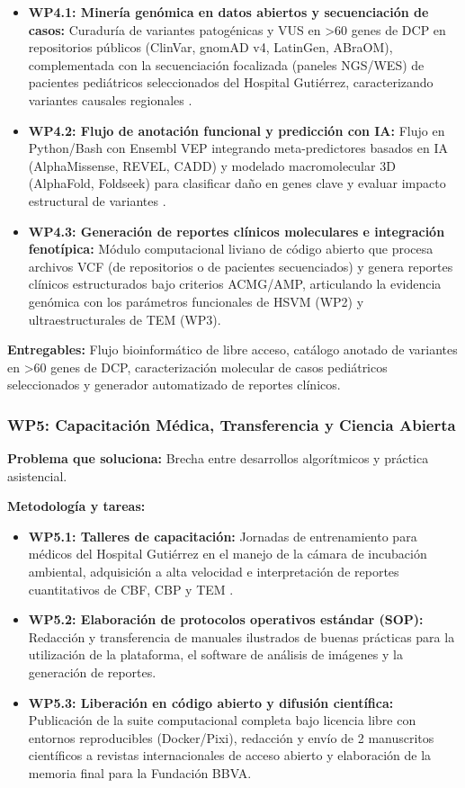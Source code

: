 \documentclass[11pt,letterpaper]{article}
\begin{document}
\begin{itemize}[leftmargin=*,noitemsep,topsep=1pt]
    \item \textbf{WP4.1: Minería genómica en datos abiertos y secuenciación de casos:} Curaduría de variantes patogénicas y VUS en >60 genes de DCP en repositorios públicos (ClinVar, gnomAD v4, LatinGen, ABraOM), complementada con la secuenciación focalizada (paneles NGS/WES) de pacientes pediátricos seleccionados del Hospital Gutiérrez, caracterizando variantes causales regionales \cite{Collison2025}.
    \item \textbf{WP4.2: Flujo de anotación funcional y predicción con IA:} Flujo en Python/Bash con Ensembl VEP integrando meta-predictores basados en IA (AlphaMissense, REVEL, CADD) y modelado macromolecular 3D (AlphaFold, Foldseek) para clasificar daño en genes clave y evaluar impacto estructural de variantes \cite{Paff2021,Wrona2025}.
    \item \textbf{WP4.3: Generación de reportes clínicos moleculares e integración fenotípica:} Módulo computacional liviano de código abierto que procesa archivos VCF (de repositorios o de pacientes secuenciados) y genera reportes clínicos estructurados bajo criterios ACMG/AMP, articulando la evidencia genómica con los parámetros funcionales de HSVM (WP2) y ultraestructurales de TEM (WP3).
\end{itemize}

\textbf{Entregables:} Flujo bioinformático de libre acceso, catálogo anotado de variantes en >60 genes de DCP, caracterización molecular de casos pediátricos seleccionados y generador automatizado de reportes clínicos.

\subsubsection*{WP5: Capacitación Médica, Transferencia y Ciencia Abierta}

\textbf{Problema que soluciona:} Brecha entre desarrollos algorítmicos y práctica asistencial.

\textbf{Metodología y tareas:}

\begin{itemize}[leftmargin=*,noitemsep,topsep=1pt]
    \item \textbf{WP5.1: Talleres de capacitación:} Jornadas de entrenamiento para médicos del Hospital Gutiérrez en el manejo de la cámara de incubación ambiental, adquisición a alta velocidad e interpretación de reportes cuantitativos de CBF, CBP y TEM \cite{Robson2025,Shapiro2015,Bricmont2021}.
    \item \textbf{WP5.2: Elaboración de protocolos operativos estándar (SOP):} Redacción y transferencia de manuales ilustrados de buenas prácticas para la utilización de la plataforma, el software de análisis de imágenes y la generación de reportes.
    \item \textbf{WP5.3: Liberación en código abierto y difusión científica:} Publicación de la suite computacional completa bajo licencia libre con entornos reproducibles (Docker/Pixi), redacción y envío de 2 manuscritos científicos a revistas internacionales de acceso abierto y elaboración de la memoria final para la Fundación BBVA.
\end{itemize}
\end{document}
